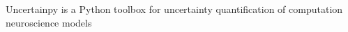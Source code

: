 \documentclass[presentation]{beamer}
\begin{document}
\begin{frame}[fragile]{Uncertainpy is a Python toolbox for uncertainty quantification of computation neuroscience models}


%
%
%
%

\end{frame}
\end{document}
